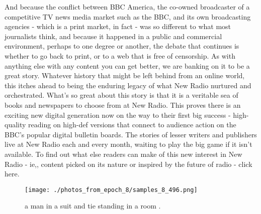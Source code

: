 \documentclass{article}%
\begin{document}
And because the conflict between BBC America, the co{-}owned broadcaster of a competitive TV news media market such as the BBC, and its own broadcasting agencies {-} which is a print market, in fact {-} was so different to what most journalists think, and because it happened in a public and commercial environment, perhaps to one degree or another, the debate that continues is whether to go back to print, or to a web that is free of censorship.\newline%
As with anything else with any content you can get better, we are banking on it to be a great story. Whatever history that might be left behind from an online world, this itches ahead to being the enduring legacy of what New Radio nurtured and orchestrated.\newline%
What's so great about this story is that it is a veritable sea of books and newspapers to choose from at New Radio. This proves there is an exciting new digital generation now on the way to their first big success {-} high{-}quality reading on high{-}def versions that connect to audience action on the BBC's popular digital bulletin boards.\newline%
The stories of lesser writers and publishers live at New Radio each and every month, waiting to play the big game if it isn't available.\newline%
To find out what else readers can make of this new interest in New Radio {-} ie,, content picked on its nature or inspired by the future of radio {-} click here.\newline%

%


\begin{figure}[h!]%
\centering%
\texttt{[image: ./photos\_from\_epoch\_8/samples\_8\_496.png]}%
\caption{a man in a suit and tie standing in a room .}%
\end{figure}

%
\end{document}
